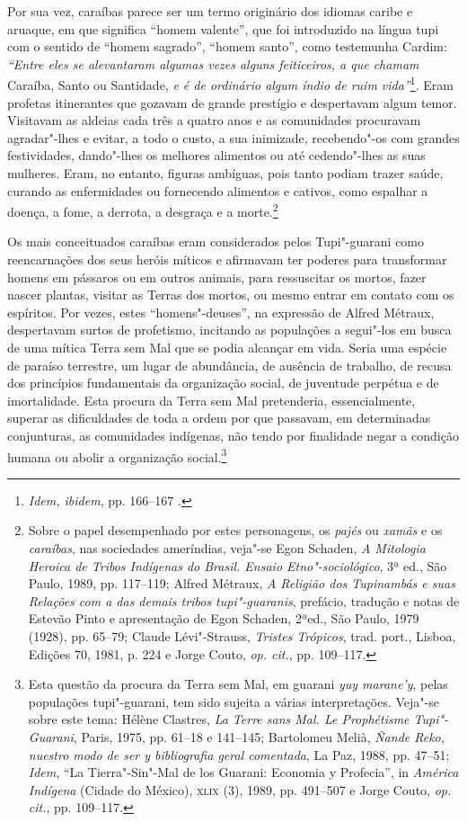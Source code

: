 Por sua vez, caraíbas parece ser um termo originário dos
idiomas caribe e aruaque, em que significa ``homem valente'', que foi
introduzido na língua tupi com o sentido de ``homem sagrado'', ``homem
santo'', como testemunha Cardim: \textit{``Entre eles se
alevantaram algumas vezes alguns feiticeiros, a que chamam} Caraíba,
Santo ou Santidade, \textit{e é de ordinário algum índio de ruim 
vida''}\footnote{ \textit{Idem, ibidem}, pp. 166--167 .}. Eram profetas
itinerantes que gozavam de grande prestígio e despertavam algum temor.
Visitavam as aldeias cada três a quatro anos e as comunidades
procuravam agradar"-lhes e evitar, a todo o custo, a sua inimizade,
recebendo"-os com grandes festividades, dando"-lhes os melhores alimentos
ou até cedendo"-lhes as suas mulheres. Eram, no entanto, figuras
ambíguas, pois tanto podiam trazer saúde, curando as enfermidades ou
fornecendo alimentos e cativos, como espalhar a doença, a fome, a
derrota, a desgraça e a morte.\footnote{ Sobre o papel
desempenhado por estes personagens, os \textit{pajés} ou \textit{xamãs}
e os \textit{caraíbas}, nas sociedades ameríndias, veja"-se Egon
Schaden, \textit{A Mitologia Heroica de Tribos Indígenas do Brasil.
Ensaio Etno"-sociológico}, 3ª ed., São Paulo, 1989, pp. 117--119; Alfred
Métraux, \textit{A Religião dos Tupinambás e suas Relações com a das
demais tribos tupi"-guaranis}, prefácio, tradução e notas de Estevão
Pinto e apresentação de Egon Schaden, 2ªed., São Paulo, 1979 (1928),
pp. 65--79; Claude Lévi"-Strauss, \textit{Tristes Trópicos}, trad. port.,
Lisboa, Edições 70, 1981, p. 224 e Jorge Couto, \textit{op. cit.}, pp. 109--117.} 

 Os mais conceituados caraíbas eram considerados pelos
Tupi"-guarani como reencarnações dos seus heróis míticos e afirmavam
ter poderes para transformar homens em pássaros ou em outros animais,
para ressuscitar os mortos, fazer nascer plantas, visitar as Terras
dos mortos, ou mesmo entrar em contato com os espíritos. Por vezes,
estes ``homens"-deuses'', na expressão de Alfred Métraux, despertavam
surtos de profetismo, incitando as populações a segui"-los em busca de
uma mítica Terra sem Mal que se podia alcançar em vida. Seria uma
espécie de paraíso terrestre, um lugar de abundância, de ausência de
trabalho, de recusa dos princípios fundamentais da organização social,
de juventude perpétua e de imortalidade. Esta procura da Terra sem Mal
pretenderia, essencialmente, superar as dificuldades de toda a ordem
por que passavam, em determinadas conjunturas, as comunidades indígenas,
não tendo por finalidade negar a condição humana ou abolir a
organização social.\footnote{ Esta questão da procura da Terra sem
Mal, em guarani \textit{yuy marane'y}, pelas populações tupi"-guarani, 
tem sido sujeita a várias interpretações. Veja"-se sobre este tema:
Hélène Clastres, \textit{La Terre sans Mal. Le Prophétisme
Tupi"-Guarani}, Paris, 1975, pp. 61--18 e 141--145; Bartolomeu Melià,
\textit{Ñande Reko, nuestro modo de ser y bibliografia geral comentada}, 
La Paz, 1988, pp. 47--51; \textit{Idem}, ``La Tierra"-Sin"-Mal de los Guarani:
Economia y Profecia'', in \textit{América Indígena} (Cidade do México),
\textsc{xlix} (3), 1989, pp. 491--507 e Jorge Couto, \textit{op. cit.}, pp. 109--117.} 

